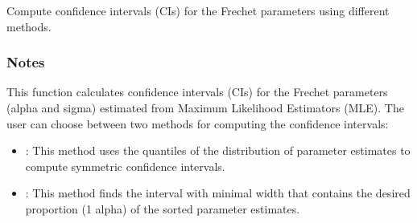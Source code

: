 \documentclass[a4paper,11pt,openany,english]{sphinxmanual}
\begin{document}
\begin{fulllineitems}
\begin{sphinxVerbatim}[commandchars=\\\{\}]
\end{sphinxVerbatim}

\begin{fulllineitems}
\label{\detokenize{api_topt:xtremes.topt.Frechet_ML_estimators.get_CIs}}
\pysigstartsignatures
{}
\pysigstopsignatures
\sphinxAtStartPar
Compute confidence intervals (CIs) for the Frechet parameters using different methods.


\subsubsection{Notes}
\label{\detokenize{api_topt:id68}}
\sphinxAtStartPar
This function calculates confidence intervals (CIs) for the Frechet parameters (alpha and sigma) 
estimated from Maximum Likelihood Estimators (MLE). The user can choose between two methods for computing the confidence intervals:
\begin{itemize}
\item {} 
\sphinxAtStartPar
{}: This method uses the quantiles of the distribution of parameter estimates to compute symmetric confidence intervals.

\item {} 
\sphinxAtStartPar
{}: This method finds the interval with minimal width that contains the desired proportion (1 \sphinxhyphen{} alpha) of the sorted parameter estimates.


\end{itemize}
\end{fulllineitems}
\end{fulllineitems}
\end{document}
